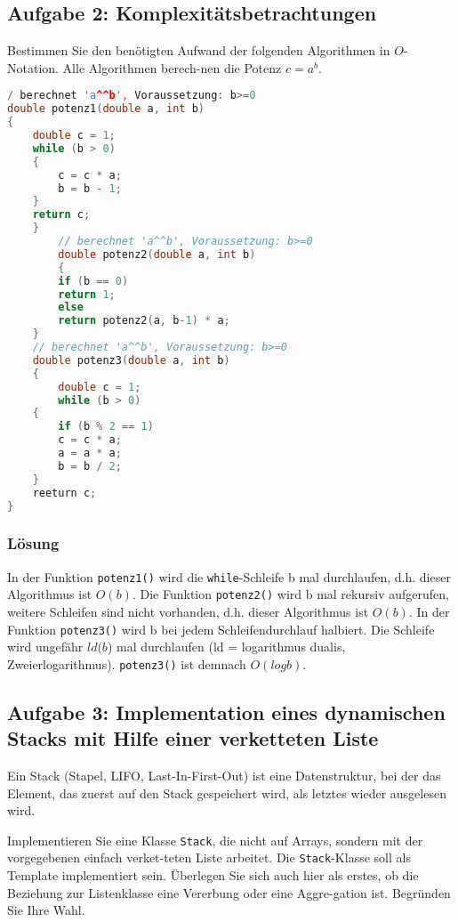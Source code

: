 \subsection{Aufgabe 2: Komplexitätsbetrachtungen}
Bestimmen Sie den benötigten Aufwand der folgenden Algorithmen in $O$-Notation. Alle Algorithmen berech-nen die Potenz $c=a^b$.
\begin{lstlisting}[language=C++, style=C++, multicols=2]
/ berechnet 'a^^b', Voraussetzung: b>=0
double potenz1(double a, int b)
{
    double c = 1;
    while (b > 0)
    {
        c = c * a;
        b = b - 1;
    }
    return c;
    }
        // berechnet 'a^^b', Voraussetzung: b>=0
        double potenz2(double a, int b)
        {
        if (b == 0)
        return 1;
        else
        return potenz2(a, b-1) * a;
    }
    // berechnet 'a^^b', Voraussetzung: b>=0
    double potenz3(double a, int b)
    {
        double c = 1;
        while (b > 0)
    {
        if (b % 2 == 1)
        c = c * a;
        a = a * a;
        b = b / 2;
    }
    reeturn c;
}
\end{lstlisting}
\subsubsection{Lösung}
In der Funktion \texttt{potenz1()} wird die \texttt{while}-Schleife b mal durchlaufen, d.h. dieser Algorithmus ist $O(b)$.
Die Funktion \texttt{potenz2()} wird b mal rekursiv aufgerufen, weitere Schleifen sind nicht vorhanden, d.h. dieser Algorithmus ist $O(b)$.
In der Funktion \texttt{potenz3()} wird b bei jedem Schleifendurchlauf halbiert. Die Schleife wird ungefähr $ld(b$) mal durchlaufen (ld = logarithmus dualis, Zweierlogarithmus). \texttt{potenz3()} ist demnach $O(log b)$.

\subsection{Aufgabe 3: Implementation eines dynamischen Stacks mit Hilfe einer verketteten Liste}
Ein Stack (Stapel, LIFO, Last-In-First-Out) ist eine Datenstruktur, bei der das Element, das zuerst auf den Stack gespeichert wird, als letztes wieder ausgelesen wird.

Implementieren Sie eine Klasse \texttt{Stack}, die nicht auf Arrays, sondern mit der vorgegebenen einfach verket-teten Liste arbeitet. Die \texttt{Stack}-Klasse soll als Template implementiert sein.
Überlegen Sie sich auch hier als erstes, ob die Beziehung zur Listenklasse eine Vererbung oder eine Aggre-gation ist. Begründen Sie Ihre Wahl.

